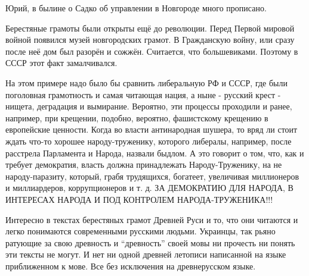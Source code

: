 \begin{itemize}

Юрий, в былине о Садко об управлении в Новгороде много прописано.


Берестяные грамоты были открыты ещё до революции. Перед Первой мировой войной
появился музей новгородских грамот. В Гражданскую войну, или сразу после неё
дом был разорён и сожжён. Считается, что большевиками. Поэтому в СССР этот факт
замалчивался.


На этом примере надо было бы сравнить либеральную РФ и СССР, где были
поголовная грамотность и самая читающая нация, а ныне - русский крест - нищета,
деградация и вымирание. Вероятно, эти процессы проходили и ранее, например, при
крещении, подобно, вероятно, фашистскому крещению в европейские ценности. Когда
во власти антинародная шушера, то вряд ли стоит ждать что-то хорошее
народу-труженику, которого либералы, например, после расстрела Парламента и
Народа, назвали быдлом. А это говорит о том, что, как и требует демократия,
власть должна принадлежать Народу-Труженику, на не народу-паразиту, который,
грабя трудящихся, богатеет, увеличивая миллионеров и миллиардеров,
коррупционеров и т. д. ЗА ДЕМОКРАТИЮ ДЛЯ НАРОДА, В ИНТЕРЕСАХ НАРОДА И ПОД
КОНТРОЛЕМ НАРОДА-ТРУЖЕНИКА!!!


Интересно в текстах берестяных грамот Древней Руси и то, что они читаются и
легко понимаются современными русскими людьми. Украинцы, так рьяно ратующие за
свою древность и \enquote{древность} своей мовы ни прочесть ни понять эти тексты не
могут. И нет ни одной древней летописи написанной на языке приближенном к мове.
Все без исключения на древнерусском языке.



\end{itemize}
